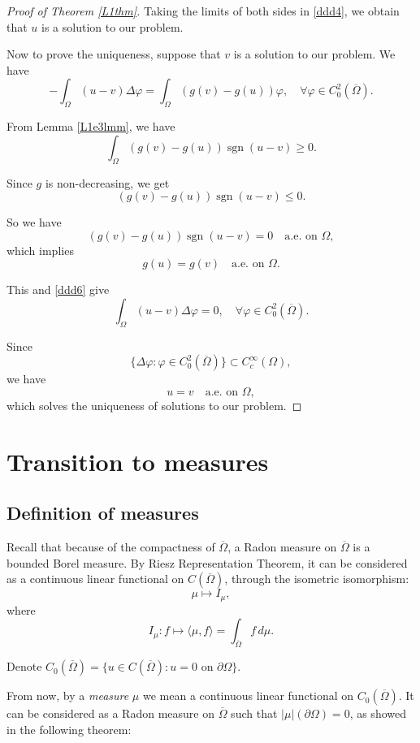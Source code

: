 \documentclass[a4paper, 11pt]{report}
\theoremstyle{definition}\newtheorem*{rmk}{Remark}
\DeclareMathOperator{\sgn}{sgn}
\begin{document}
\begin{proof}[Proof of Theorem \ref{L1thm}]
Taking the limits of both sides in \eqref{ddd4}, we obtain that $u$ is a solution to our problem.

Now to prove the uniqueness, suppose that $v$ is a solution to our problem. We have
\begin{equation}\label{ddd6}
-\int_{\Omega}(u-v)\Delta \varphi = \int_{\Omega}(g(v)-g(u))\varphi, \quad \forall \varphi\in C^2_0(\overline{\Omega}).
\end{equation}

From Lemma \ref{L1e3lmm}, we have
\[
\int_{\Omega}(g(v)-g(u))\sgn(u-v) \ge 0.
\]

Since $g$ is non-decreasing, we get
\[
(g(v)-g(u))\sgn(u-v) \le 0.
\]

So we have
\[
(g(v)-g(u))\sgn(u-v) = 0\quad \text{a.e.\ on }\Omega,
\]
which implies
\[
g(u) = g(v) \quad \text{a.e.\ on }\Omega.
\]

This and \eqref{ddd6} give
\[
\int_{\Omega}(u-v)\Delta \varphi = 0, \quad \forall \varphi\in C^2_0(\overline{\Omega}).
\]

Since
\[
\{\Delta \varphi:\varphi\in C^2_0(\overline{\Omega})\} \subset C_c^{\infty}(\Omega),
\]
we have
\[
u = v \quad \text{a.e.\ on }\Omega,
\]
which solves the uniqueness of solutions to our problem.
\end{proof}

\chapter{Transition to measures}

\section{Definition of measures}
\mbox{}

Recall that because of the compactness of $\overline{\Omega}$, a Radon measure on $\overline{\Omega}$ is a bounded Borel measure. By Riesz Representation Theorem, it can be considered as a continuous linear functional on $C(\overline{\Omega})$, through the isometric isomorphism:
\[
\mu \mapsto I_{\mu},
\]
where
\[
I_{\mu}: f\mapsto \langle \mu, f\rangle = \int_{\overline{\Omega}}f\,d\mu .
\]

Denote $C_0(\overline{\Omega}) = \{u\in C(\overline{\Omega}): u = 0 \text{ on }\partial\Omega\}$.

From now, by a \emph{measure} $\mu$ we mean a continuous linear functional on $C_0(\overline{\Omega})$. It can be considered as a Radon measure on $\overline{\Omega}$ such that $|\mu | (\partial \Omega) = 0$, as showed in the following theorem:
\end{document}

